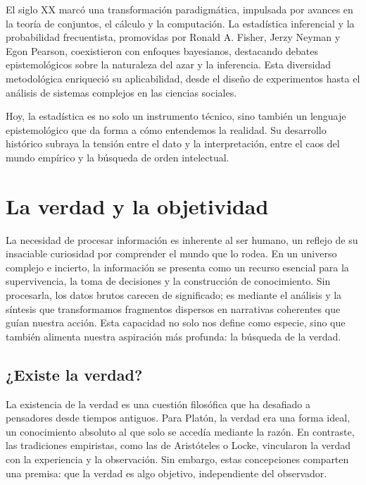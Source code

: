 \documentclass[
  letterpaper,
  DIV=11,
  numbers=noendperiod]{scrreprt}
\begin{document}
El siglo XX marcó una transformación paradigmática, impulsada por
avances en la teoría de conjuntos, el cálculo y la computación. La
estadística inferencial y la probabilidad frecuentista, promovidas por
Ronald A. Fisher, Jerzy Neyman y Egon Pearson, coexistieron con enfoques
bayesianos, destacando debates epistemológicos sobre la naturaleza del
azar y la inferencia. Esta diversidad metodológica enriqueció su
aplicabilidad, desde el diseño de experimentos hasta el análisis de
sistemas complejos en las ciencias sociales.

Hoy, la estadística es no solo un instrumento técnico, sino también un
lenguaje epistemológico que da forma a cómo entendemos la realidad. Su
desarrollo histórico subraya la tensión entre el dato y la
interpretación, entre el caos del mundo empírico y la búsqueda de orden
intelectual.

\section{La verdad y la objetividad}\label{la-verdad-y-la-objetividad}

La necesidad de procesar información es inherente al ser humano, un
reflejo de su insaciable curiosidad por comprender el mundo que lo
rodea. En un universo complejo e incierto, la información se presenta
como un recurso esencial para la supervivencia, la toma de decisiones y
la construcción de conocimiento. Sin procesarla, los datos brutos
carecen de significado; es mediante el análisis y la síntesis que
transformamos fragmentos dispersos en narrativas coherentes que guían
nuestra acción. Esta capacidad no solo nos define como especie, sino que
también alimenta nuestra aspiración más profunda: la búsqueda de la
verdad.

\subsection{¿Existe la verdad?}\label{existe-la-verdad}

La existencia de la verdad es una cuestión filosófica que ha desafiado a
pensadores desde tiempos antiguos. Para Platón, la verdad era una forma
ideal, un conocimiento absoluto al que solo se accedía mediante la
razón. En contraste, las tradiciones empiristas, como las de Aristóteles
o Locke, vincularon la verdad con la experiencia y la observación. Sin
embargo, estas concepciones comparten una premisa: que la verdad es algo
objetivo, independiente del observador.
\end{document}
